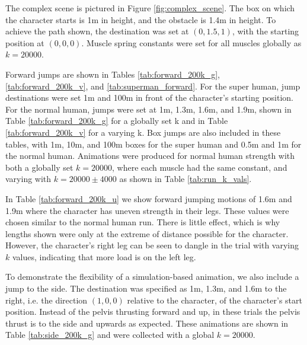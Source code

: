 The complex scene is pictured in Figure \ref{fig:complex_scene}.  The box on which the character starts is 1m in height, and the obstacle is 1.4m in height.  To achieve the path shown, the destination was set at $(0, 1.5, 1)$, with the starting position at $(0, 0, 0)$.  Muscle spring constants were set for all muscles globally as $k=20000$.

Forward jumps are shown in Tables \ref{tab:forward_200k_g}, \ref{tab:forward_200k_v}, and \ref{tab:superman_forward}. For the super human, jump destinations were set 1m and 100m in front of the character's starting position.  For the normal human, jumps were set at 1m, 1.3m, 1.6m, and 1.9m, shown in Table \ref{tab:forward_200k_g} for a globally set k and in Table \ref{tab:forward_200k_v} for a varying k.  Box jumps are also included in these tables, with 1m, 10m, and 100m boxes for the super human and 0.5m and 1m for the normal human.  Animations were produced for normal human strength with both a globally set $k=20000$, where each muscle had the same constant, and varying with $k=20000\pm 4000$ as shown in Table \ref{tab:run_k_vals}.

In Table \ref{tab:forward_200k_u} we show forward jumping motions of 1.6m and 1.9m where the character has uneven strength in their legs.  These values were chosen similar to the normal human run.  There is little effect, which is why lengths shown were only at the extreme of distance possible for the character.  However, the character's right leg can be seen to dangle in the trial with varying $k$ values, indicating that more load is on the left leg.

To demonstrate the flexibility of a simulation-based animation, we also include a jump to the side.  The destination was specified as 1m, 1.3m, and 1.6m to the right, i.e. the direction $(1, 0, 0)$ relative to the character, of the character's start position.  Instead of the pelvis thrusting forward and up, in these trials the pelvis thrust is to the side and upwards as expected.  These animations are shown in Table \ref{tab:side_200k_g} and were collected with a global $k=20000$.

\newcommand{\floatedfig}[1]{\begin{subfigure}[h]{0.2\textwidth}\vspace{1mm}\texttt{[image: \#1]}\vspace{1mm}\end{subfigure}\hspace{0.025\textwidth}}
\newcommand{\framesubfig}[1]{\begin{subfigure}[h]{0.24\textwidth}\texttt{[image: \#1]}\end{subfigure}}

